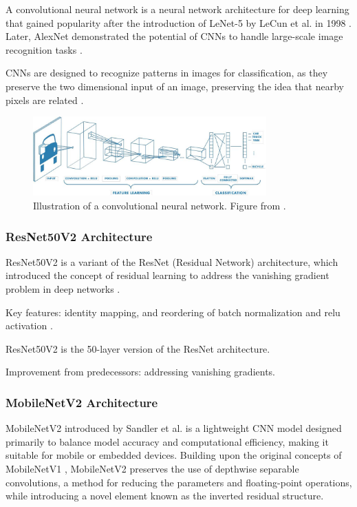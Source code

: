  A convolutional neural network is a neural network architecture for deep learning that gained popularity after the introduction of LeNet-5 by LeCun et al. in 1998 \cite{lecun1998}. Later, AlexNet \cite{NIPS2012_c399862d} demonstrated the potential of CNNs to handle large-scale image recognition tasks . 
 
 CNNs are designed to recognize patterns in images for classification, as they preserve the two dimensional input of an image, preserving the idea that nearby pixels are related \cite{zhang2023dive}. 

\begin{figure}[ht]
    \centering
    \includegraphics[width=0.8\textwidth]{Images/CNN_illustration.jpg} 
    \caption{Illustration of a convolutional neural network. Figure from \cite{mathworks_cnn}. }
    \label{fig:cnn_illustration}
\end{figure}




\subsubsection{ResNet50V2 Architecture}
ResNet50V2 is a variant of the ResNet (Residual Network) architecture, which introduced the concept of residual learning to address the vanishing gradient problem in deep networks \cite{he2016}. 

Key features: identity mapping, and reordering of batch normalization and relu activation \cite{he2016identitymappingsdeepresidual}.

ResNet50V2 is the 50-layer version of the ResNet architecture. 

Improvement from predecessors: addressing vanishing gradients.


\subsubsection{MobileNetV2 Architecture}
MobileNetV2 introduced by Sandler et al. \cite{sandler2018mobilenetv2} is a lightweight CNN model designed primarily to balance model accuracy and computational efficiency, making it suitable for mobile or embedded devices. Building upon the original concepts of MobileNetV1 \cite{howard2017mobilenetsefficientconvolutionalneural}, MobileNetV2 preserves the use of depthwise separable convolutions, a method for reducing the parameters and floating-point operations, while introducing a novel element known as the inverted residual structure. 

